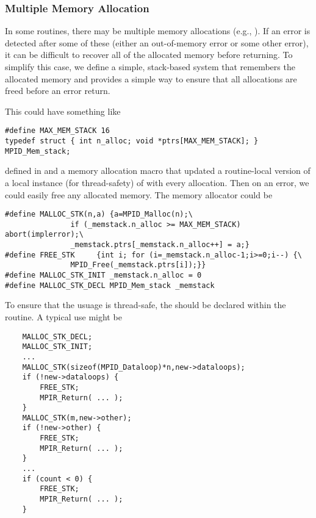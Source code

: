 \documentclass{article}
\begin{document}
\subsubsection{Multiple Memory Allocation}
In some routines, there may be multiple memory allocations (e.g.,
).  If an error is 
detected after some of these (either an out-of-memory error or some other
error), it can be difficult to recover all of the allocated memory before
returning.  To simplify this case, we define a simple, stack-based system that
remembers the allocated memory and provides a simple way to ensure that all
allocations are freed before an error return.


This could have something like
\begin{verbatim}
#define MAX_MEM_STACK 16
typedef struct { int n_alloc; void *ptrs[MAX_MEM_STACK]; } MPID_Mem_stack;
\end{verbatim}
defined in  
and a memory allocation macro that updated a routine-local version of a
local instance (for thread-safety) of  
with every allocation.  Then on an error, we could easily free any allocated
memory.  The memory allocator could be
\begin{verbatim}
#define MALLOC_STK(n,a) {a=MPID_Malloc(n);\
               if (_memstack.n_alloc >= MAX_MEM_STACK) abort(implerror);\
               _memstack.ptrs[_memstack.n_alloc++] = a;}
#define FREE_STK     {int i; for (i=_memstack.n_alloc-1;i>=0;i--) {\
               MPID_Free(_memstack.ptrs[i]);}}
#define MALLOC_STK_INIT _memstack.n_alloc = 0
#define MALLOC_STK_DECL MPID_Mem_stack _memstack
\end{verbatim}


To ensure that the usuage is thread-safe, the \code{_memstack} should be
declared within the routine.  A typical use might be
\begin{verbatim}
    MALLOC_STK_DECL;
    MALLOC_STK_INIT;
    ...
    MALLOC_STK(sizeof(MPID_Dataloop)*n,new->dataloops);
    if (!new->dataloops) {
        FREE_STK;
        MPIR_Return( ... );
    }
    MALLOC_STK(m,new->other);
    if (!new->other) {
        FREE_STK;
        MPIR_Return( ... );
    }
    ...
    if (count < 0) {
        FREE_STK; 
        MPIR_Return( ... );
    }
\end{verbatim}
\end{document}
